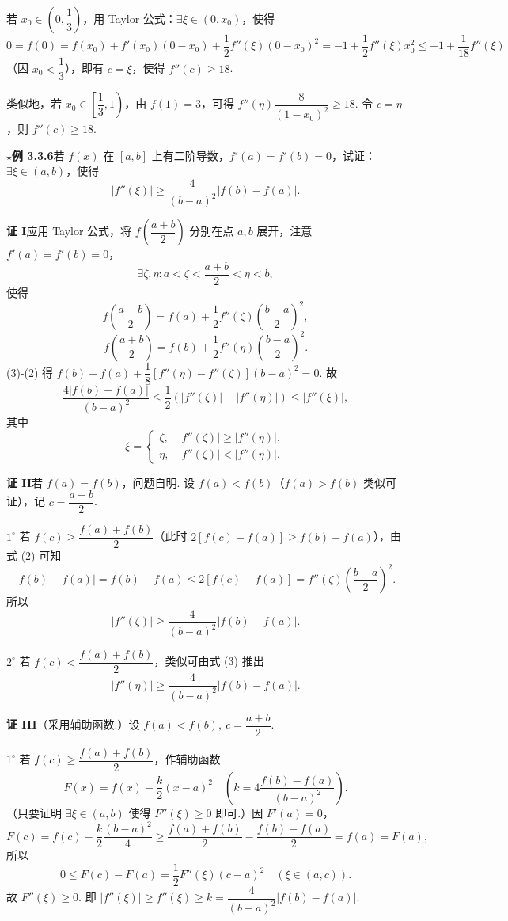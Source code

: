 \documentclass[UTF8,12pt,a4paper,fontset=fandol]{ctexart}
\begin{document}
若 $x_0\in\left(0,\dfrac13\right)$，用 Taylor 公式：$\exists \xi\in(0,x_0)$，使得
\[
  0=f(0)=f(x_0)+f'(x_0)(0-x_0)+\frac12f''(\xi)(0-x_0)^2
  =-1+\frac12f''(\xi)x_0^2
  \le -1+\frac1{18}f''(\xi)
\]
（因 $x_0<\dfrac13$），即有 $c=\xi$，使得 $f''(c)\ge18$.

类似地，若 $x_0\in\left[\dfrac13,1\right)$，由 $f(1)=3$，可得 $f''(\eta)\dfrac{8}{(1-x_0)^2}\ge18$. 令 $c=\eta$，则 $f''(c)\ge18$.

\noindent\textbf{$\star$例 3.3.6}\quad 若 $f(x)$ 在 $[a,b]$ 上有二阶导数，$f'(a)=f'(b)=0$，试证：$\exists \xi\in(a,b)$，使得
\begin{equation}
  |f''(\xi)|\ge\frac4{(b-a)^2}|f(b)-f(a)|.
\tag{1}
\end{equation}

\noindent\textbf{证 I}\quad 应用 Taylor 公式，将 $f\left(\dfrac{a+b}{2}\right)$ 分别在点 $a,b$ 展开，注意 $f'(a)=f'(b)=0$，
\[
  \exists \zeta,\eta:a<\zeta<\frac{a+b}{2}<\eta<b,
\]
使得
\[
  f\left(\frac{a+b}{2}\right)=f(a)+\frac12f''(\zeta)\left(\frac{b-a}{2}\right)^2,
\tag{2}
\]
\[
  f\left(\frac{a+b}{2}\right)=f(b)+\frac12f''(\eta)\left(\frac{b-a}{2}\right)^2.
\tag{3}
\]
(3)-(2) 得 $f(b)-f(a)+\dfrac18[f''(\eta)-f''(\zeta)](b-a)^2=0$. 故
\[
  \frac{4|f(b)-f(a)|}{(b-a)^2}
  \le\frac12(|f''(\zeta)|+|f''(\eta)|)\le |f''(\xi)|,
\]
其中
\[
  \xi=
  \begin{cases}
    \zeta,& |f''(\zeta)|\ge |f''(\eta)|,\\
    \eta,& |f''(\zeta)|<|f''(\eta)|.
  \end{cases}
\]

\noindent\textbf{证 II}\quad 若 $f(a)=f(b)$，问题自明. 设 $f(a)<f(b)$（$f(a)>f(b)$ 类似可证），记 $c=\dfrac{a+b}{2}$.

$1^\circ$ 若 $f(c)\ge\dfrac{f(a)+f(b)}2$（此时 $2[f(c)-f(a)]\ge f(b)-f(a)$），由式 (2) 可知
\[
  |f(b)-f(a)|=f(b)-f(a)\le2[f(c)-f(a)]
  =f''(\zeta)\left(\frac{b-a}{2}\right)^2.
\]
所以
\[
  |f''(\zeta)|\ge\frac4{(b-a)^2}|f(b)-f(a)|.
\]

$2^\circ$ 若 $f(c)<\dfrac{f(a)+f(b)}2$，类似可由式 (3) 推出
\[
  |f''(\eta)|\ge\frac4{(b-a)^2}|f(b)-f(a)|.
\]

\noindent\textbf{证 III}\quad （采用辅助函数.）设 $f(a)<f(b),\ c=\dfrac{a+b}{2}$.

$1^\circ$ 若 $f(c)\ge\dfrac{f(a)+f(b)}2$，作辅助函数
\[
  F(x)=f(x)-\frac{k}{2}(x-a)^2
  \quad\left(k=4\frac{f(b)-f(a)}{(b-a)^2}\right).
\]
（只要证明 $\exists \xi\in(a,b)$ 使得 $F''(\xi)\ge0$ 即可.）因 $F'(a)=0$，
\[
  F(c)=f(c)-\frac{k}{2}\frac{(b-a)^2}{4}
  \ge\frac{f(a)+f(b)}2-\frac{f(b)-f(a)}2
  =f(a)=F(a),
\]
所以
\[
  0\le F(c)-F(a)=\frac12F''(\xi)(c-a)^2\quad(\xi\in(a,c)).
\]
故 $F''(\xi)\ge0$. 即 $|f''(\xi)|\ge f''(\xi)\ge k=\dfrac4{(b-a)^2}|f(b)-f(a)|$.
\end{document}
